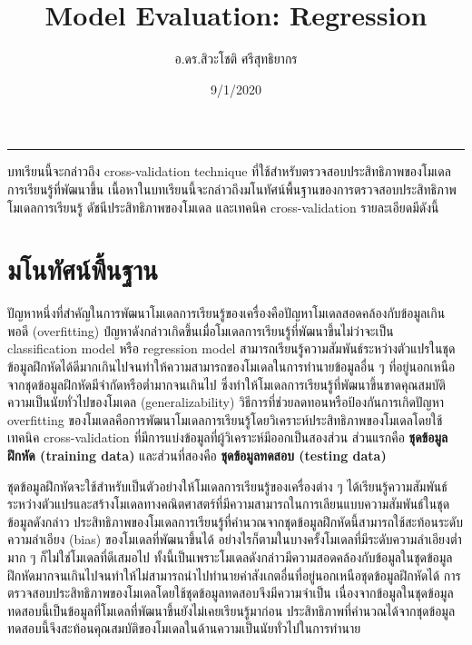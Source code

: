 \documentclass[
]{article}
\title{Model Evaluation: Regression}
\author{อ.ดร.สิวะโชติ ศรีสุทธิยากร}
\date{9/1/2020}
\begin{document}
\maketitle

\begin{center}\rule{0.5\linewidth}{0.5pt}\end{center}

บทเรียนนี้จะกล่าวถึง cross-validation technique
ที่ใช้สำหรับตรวจสอบประสิทธิภาพของโมเดลการเรียนรู้ที่พัฒนาขึ้น
เนื้อหาในบทเรียนนี้จะกล่าวถึงมโนทัศน์พื้นฐานของการตรวจสอบประสิทธิภาพโมเดลการเรียนรู้
ดัชนีประสิทธิภาพของโมเดล และเทคนิค cross-validation รายละเอียดมีดังนี้

\hypertarget{uxe21uxe42uxe19uxe17uxe31uxe28uxe19uxe4cuxe1euxe37uxe49uxe19uxe10uxe32uxe19}{%
\section{\texorpdfstring{\textbf{มโนทัศน์พื้นฐาน}}{มโนทัศน์พื้นฐาน}}\label{uxe21uxe42uxe19uxe17uxe31uxe28uxe19uxe4cuxe1euxe37uxe49uxe19uxe10uxe32uxe19}}

ปัญหาหนึ่งที่สำคัญในการพัฒนาโมเดลการเรียนรู้ของเครื่องคือปัญหาโมเดลสอดคล้องกับข้อมูลเกินพอดี
(overfitting)
ปํญหาดังกล่าวเกิดขึ้นเมื่อโมเดลการเรียนรู้ที่พัฒนาขึ้นไม่ว่าจะเป็น
classification model หรือ regression model
สามารถเรียนรู้ความสัมพันธ์ระหว่างตัวแปรในชุดข้อมูลฝึกหัดได้ดีมากเกินไปจนทำให้ความสามารถของโมเดลในการทำนายข้อมูลอื่น
ๆ ที่อยู่นอกเหนือจากชุดข้อมูลฝึกหัดมีจำกัดหรือต่ำมากจนเกินไป
ซึ่งทำให้โมเดลการเรียนรู้ที่พัฒนาขึ้นขาดคุณสมบัติความเป็นนัยทั่วไปของโมเดล
(generalizability) วิธีการที่ช่วยลดทอนหรือป้องกันการเกิดปัญหา
overfitting
ของโมเดลคือการพัฒนาโมเดลการเรียนรู้โดยวิเคราะห์ประสิทธิภาพของโมเดลโดยใช้เทคนิค
cross-validation ที่มีการแบ่งข้อมูลที่ผู้วิเคราะห์มีออกเป็นสองส่วน
ส่วนแรกคือ \textbf{ชุดข้อมูลฝึกหัด (training data)} และส่วนที่สองคือ
\textbf{ชุดข้อมูลทดสอบ (testing data)}

ชุดข้อมูลฝึกหัดจะใช้สำหรับเป็นตัวอย่างให้โมเดลการเรียนรู้ของเครื่องต่าง
ๆ
ได้เรียนรู้ความสัมพันธ์ระหว่างตัวแปรและสร้างโมเดลทางคณิตศาสตร์ที่มีความสามารถในการเลียนแบบความสัมพันธ์ในชุดข้อมูลดังกล่าว
ประสิทธิภาพของโมเดลการเรียนรู้ที่คำนวณจากชุดข้อมูลฝึกหัดนี้สามารถใช้สะท้อนระดับความลำเอียง
(bias) ของโมเดลที่พัฒนาขึ้นได้
อย่างไรก็ตามในบางครั้งโมเดลที่มีระดับความลำเอียงต่ำมาก ๆ
ก็ไม่ใช่โมเดลที่ดีเสมอไป
ทั้งนี้เป็นเพราะโมเดลดังกล่าวมีความสอดคล้องกับข้อมูลในชุดข้อมูลฝึกหัดมากจนเกินไปจนทำให้ไม่สามารถนำไปทำนายค่าสังเกตอื่นที่อยู่นอกเหนือชุดข้อมูลฝึกหัดได้
การตรวจสอบประสิทธิภาพของโมเดลโดยใช้ชุดข้อมูลทดสอบจึงมีความจำเป็น
เนื่องจากข้อมูลในชุดข้อมูลทดสอบนี้เป็นข้อมูลที่โมเดลที่พัฒนาขึ้นยังไม่เคยเรียนรู้มาก่อน
ประสิทธิภาพที่คำนวณได้จากชุดข้อมูลทดสอบนี้จึงสะท้อนคุณสมบัติของโมเดลในด้านความเป็นนัยทั่วไปในการทำนาย
\end{document}
